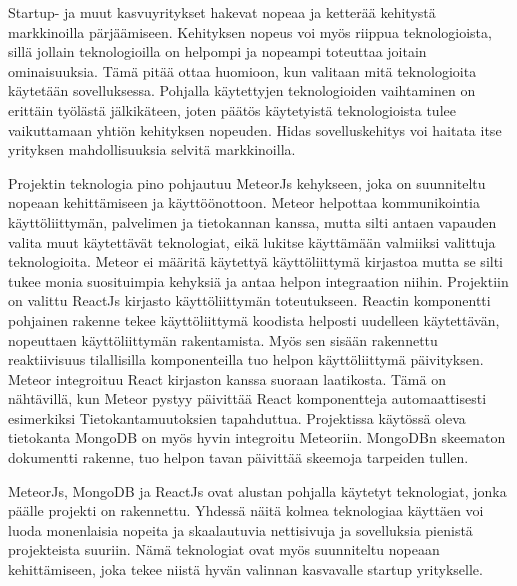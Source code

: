\documentclass[11pt,a4paper,titlepage,oneside]{article}
\begin{document}
Startup- ja muut kasvuyritykset hakevat nopeaa ja ketterää kehitystä markkinoilla pärjäämiseen.
Kehityksen nopeus voi myös riippua teknologioista, sillä jollain teknologioilla on helpompi ja nopeampi toteuttaa joitain ominaisuuksia.
Tämä pitää ottaa huomioon, kun valitaan mitä teknologioita käytetään sovelluksessa.
Pohjalla käytettyjen teknologioiden vaihtaminen on erittäin työlästä jälkikäteen,
joten päätös käytetyistä teknologioista tulee vaikuttamaan yhtiön kehityksen nopeuden.
Hidas sovelluskehitys voi haitata itse yrityksen mahdollisuuksia selvitä markkinoilla.
\medskip



Projektin teknologia pino pohjautuu MeteorJs kehykseen, joka on suunniteltu nopeaan kehittämiseen ja käyttöönottoon.
Meteor helpottaa kommunikointia käyttöliittymän, palvelimen ja tietokannan kanssa, 
mutta silti antaen vapauden valita muut käytettävät teknologiat, eikä lukitse käyttämään valmiiksi valittuja teknologioita.
Meteor ei määritä käytettyä käyttöliittymä kirjastoa mutta se silti tukee monia suosituimpia kehyksiä ja antaa helpon integraation niihin.
Projektiin on valittu ReactJs kirjasto käyttöliittymän toteutukseen.
Reactin komponentti pohjainen rakenne tekee käyttöliittymä koodista helposti uudelleen käytettävän, nopeuttaen käyttöliittymän rakentamista. 
Myös sen sisään rakennettu reaktiivisuus tilallisilla komponenteilla tuo helpon käyttöliittymä päivityksen.
Meteor integroituu React kirjaston kanssa suoraan laatikosta.
Tämä on nähtävillä, kun Meteor pystyy päivittää React komponentteja automaattisesti esimerkiksi Tietokantamuutoksien tapahduttua. 
Projektissa käytössä oleva tietokanta MongoDB on myös hyvin integroitu Meteoriin.
MongoDBn skeematon dokumentti rakenne, tuo helpon tavan päivittää skeemoja tarpeiden tullen.
\medskip


MeteorJs, MongoDB ja ReactJs ovat alustan pohjalla käytetyt teknologiat, jonka päälle projekti on rakennettu.
Yhdessä näitä kolmea teknologiaa käyttäen voi luoda monenlaisia nopeita ja skaalautuvia nettisivuja ja sovelluksia pienistä projekteista suuriin.
Nämä teknologiat ovat myös suunniteltu nopeaan kehittämiseen, joka tekee niistä hyvän valinnan kasvavalle startup yritykselle.
\medskip









\newpage
{}                %
\end{document}
